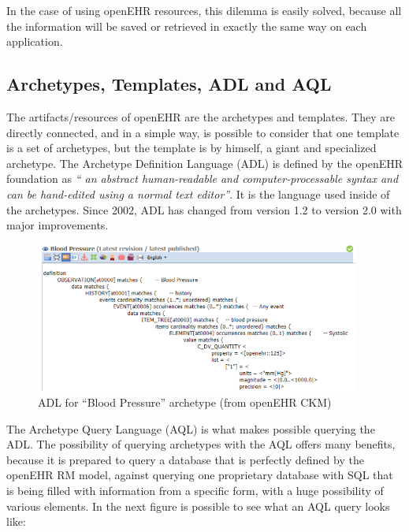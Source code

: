 \documentclass[mim_thesis.tex]{subfiles}
\begin{document}
In the case of using openEHR resources, this dilemma is easily solved, because all the information will be saved or retrieved in exactly the same way on each application.

\subsection{Archetypes, Templates, ADL and AQL}
The artifacts/resources of openEHR are the archetypes and templates. They are directly connected, and in a simple way, is possible to consider that one template is a set of archetypes, but the template is by himself, a giant and specialized archetype. The Archetype Definition Language (ADL) is defined by the openEHR foundation as \textit{“ an abstract human-readable and computer-processable syntax and can be hand-edited using a normal text editor”}. It is the language used inside of the archetypes. Since 2002, ADL has changed from version 1.2 to version 2.0 with major improvements.\\

\begin{figure}[H]
	\centering
    \includegraphics[width=0.95\textwidth]{img/bp_adl.PNG}
	\caption{ADL for “Blood Pressure” archetype (from openEHR CKM)}
	\label{fig:bp_adl}
\end{figure}

The Archetype Query Language (AQL) is what makes possible querying the ADL. The possibility of querying archetypes with the AQL offers many benefits, because it is prepared to query a database that is perfectly defined by the openEHR RM model, against querying one proprietary database with \ac{SQL} that is being filled with information from a specific form, with a huge possibility of various elements. In the next figure is possible to see what an AQL query looks like: \\
\end{document}
